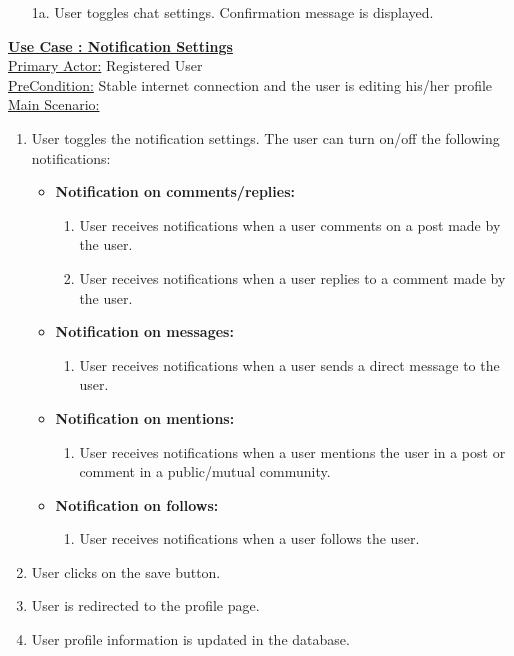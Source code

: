 \documentclass[conference,compsoc]{IEEEtran}
\newcounter{UC}
\newcommand{\nextU}{\stepcounter{UC}\theUC}
\begin{document}
\begin{enumerate}
    \item [1a.] User toggles chat settings. Confirmation message is displayed.
\end{enumerate}\vspace{0.2cm}

\underline{\textbf{Use Case \nextU: Notification Settings}}\\

\underline{Primary Actor:} Registered User\\

\underline{PreCondition:} Stable internet connection and the user is editing his/her profile\\

\underline{Main Scenario:}\\
\begin{enumerate}
    \item User toggles the notification settings. The user can turn on/off the following notifications:
          \begin{itemize}
              \item \textbf{Notification on comments/replies:}
                    \begin{enumerate}
                        \item User receives notifications when a user comments on a post made by the user.
                        \item User receives notifications when a user replies to a comment made by the user.
                    \end{enumerate}
              \item \textbf{Notification on messages:}
                    \begin{enumerate}
                        \item User receives notifications when a user sends a direct message to the user.
                    \end{enumerate}
              \item \textbf{Notification on mentions:}
                    \begin{enumerate}
                        \item User receives notifications when a user mentions the user in a post or comment in a public/mutual community.
                    \end{enumerate}
              \item \textbf{Notification on follows:}
                    \begin{enumerate}
                        \item User receives notifications when a user follows the user.
                    \end{enumerate}
          \end{itemize}
    \item User clicks on the save button.
    \item User is redirected to the profile page.
    \item User profile information is updated in the database.
\end{enumerate}
\end{document}
